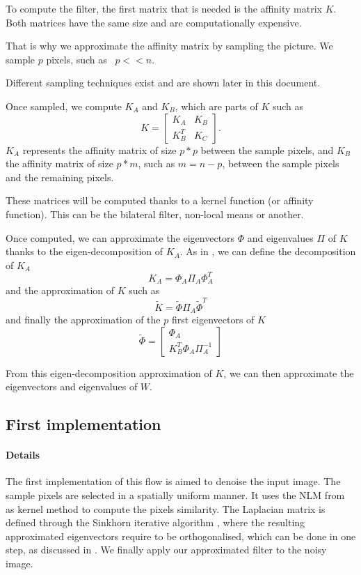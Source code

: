 \documentclass[]{article}
\begin{document}
To compute the filter, the first matrix that is needed is the affinity matrix \(K\).
Both matrices have the same size and are computationally expensive.

That is why we approximate the affinity matrix by sampling the picture.
We sample \(p\) pixels, such as  \(p << n\).

Different sampling techniques exist and are shown later in this document. %

Once sampled, we compute \(K_A\) and \(K_B\), which are parts of \(K\) such as
\[
 K = \begin{bmatrix}
  K_A & K_B \\
  K_B^T & K_C
 \end{bmatrix}.
\]
\(K_A\) represents the affinity matrix of size \(p*p\) between the sample pixels, and \(K_B\) the affinity matrix of size \(p*m\), such as \(m = n-p\), between the sample pixels and the remaining pixels.

These matrices will be computed thanks to a kernel function (or affinity function). This can be the bilateral filter, non-local means or another.

Once computed, we can approximate the eigenvectors \(\Phi\) and eigenvalues \(\Pi\) of \(K\) thanks to the eigen-decomposition of \(K_A\).
As in \cite{glide_2014}, we can define the decomposition of \(K_A\)
\[K_A = \Phi_A \Pi_A \Phi_A^T\]
and the approximation of \(K\) such as
\[\tilde{K} = \tilde{\Phi} \Pi_A \tilde{\Phi}^T\]
and finally the approximation of the \(p\) first eigenvectors of \(K\)
\[
 \tilde{\Phi} = \begin{bmatrix}
  \Phi_A \\
  K_B^T \Phi_A \Pi_A^{-1}
 \end{bmatrix}
\]

From this eigen-decomposition approximation of \(K\), we can then approximate the eigenvectors and eigenvalues of \(W\).

\subsection{First implementation}

\paragraph{Details}
The first implementation of this flow is aimed to denoise the input image.
The sample pixels are selected in a spatially uniform manner.
It uses the NLM from \cite{buades_review_2005} as kernel method to compute the pixels similarity.
The Laplacian matrix is defined through the Sinkhorn iterative algorithm \cite{milanfar_symmetrizing_2013}, where the resulting approximated eigenvectors require to be orthogonalised, which can be done in one step, as discussed in \cite{fowlkes_spectral_2004}.
We finally apply our approximated filter to the noisy image.
\end{document}
